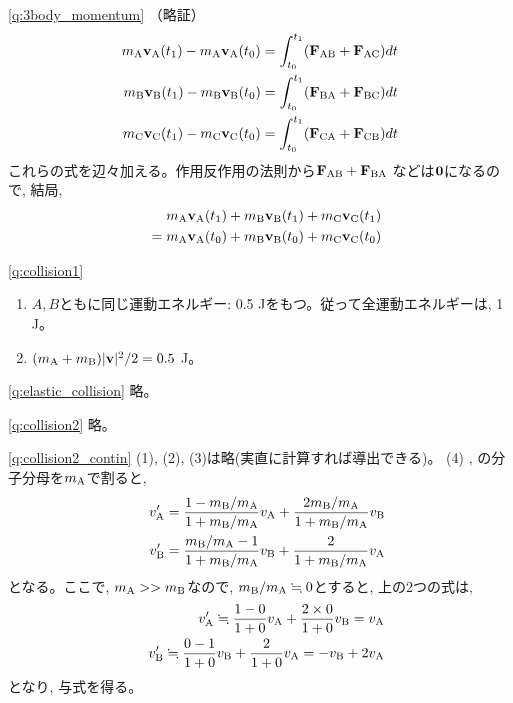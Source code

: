 \ref{q:3body_momentum}
（略証）
\begin{eqnarray*}
m_{\text A}{\bf v}_{\text A}(t_1)-m_{\text A}{\bf v}_{\text A}(t_0)=\int_{t_0}^{t_1}({\bf F}_{\text {AB}}+{\bf F}_{\text {AC}})dt\\
m_{\text B}{\bf v}_{\text B}(t_1)-m_{\text B}{\bf v}_{\text B}(t_0)=\int_{t_0}^{t_1}({\bf F}_{\text {BA}}+{\bf F}_{\text {BC}})dt\\
m_{\text C}{\bf v}_{\text C}(t_1)-m_{\text C}{\bf v}_{\text C}(t_0)=\int_{t_0}^{t_1}({\bf F}_{\text {CA}}+{\bf F}_{\text {CB}})dt
\end{eqnarray*}
これらの式を辺々加える。作用反作用の法則から${\bf F}_{\text {AB}}+{\bf F}_{\text {BA}}$
などは${\bf 0}$になるので, 結局, 
\begin{eqnarray*}
&&m_{\text A}{\bf v}_{\text A}(t_1)+m_{\text B}{\bf v}_{\text B}(t_1)+m_{\text C}{\bf v}_{\text C}(t_1)\\
&&=m_{\text A}{\bf v}_{\text A}(t_0)+m_{\text B}{\bf v}_{\text B}(t_0)+m_{\text C}{\bf v}_{\text C}(t_0)
\end{eqnarray*}

% 
\ref{q:collision1}
\begin{enumerate}
\item $A, B$ともに同じ運動エネルギー: 0.5 Jをもつ。従って全運動エネルギーは, 1 J。
\item $(m_{\text A}+m_{\text B})|{\bf v}|^2/2=0.5$ J。
\end{enumerate}

\ref{q:elastic_collision} 略。

\ref{q:collision2} 略。

\ref{q:collision2_contin}
(1), (2), (3)は略(実直に計算すれば導出できる)。\mv
(4) , の分子分母を$m_{\text A}$で割ると, 
\begin{eqnarray*}
&&v'_{\text A}=\frac{1-m_{\text B}/m_{\text A}}{1+m_{\text B}/m_{\text A}}v_{\text A}+\frac{2m_{\text B}/m_{\text A}}{1+m_{\text B}/m_{\text A}}v_{\text B}\\
&&v'_{\text B}=\frac{m_{\text B}/m_{\text A}-1}{1+m_{\text B}/m_{\text A}}v_{\text B}+\frac{2}{1+m_{\text B}/m_{\text A}}v_{\text A}
\end{eqnarray*}
となる。ここで, $m_{\text A}>>m_{\text B}$なので, $m_{\text B}/m_{\text A}\fallingdotseq0$とすると, 上の2つの式は, 
\begin{eqnarray*}
&&v'_{\text A}\fallingdotseq \frac{1-0}{1+0}v_{\text A}+\frac{2\times0}{1+0}v_{\text B}=v_{\text A}\\
&&v'_{\text B}\fallingdotseq \frac{0-1}{1+0}v_{\text B}+\frac{2}{1+0}v_{\text A}=-v_{\text B}+2v_{\text A}
\end{eqnarray*}
となり, 与式を得る。
\vspace{0.2cm}



